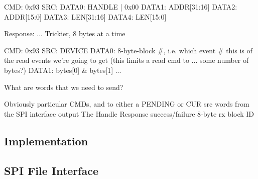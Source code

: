 CMD: 0x93
SRC: 
DATA0: HANDLE | 0x00
DATA1: ADDR[31:16]
DATA2: ADDR[15:0]
DATA3: LEN[31:16]
DATA4: LEN[15:0]

Response: ... Trickier, 8 bytes at a time

 
CMD: 0x93
SRC: DEVICE
DATA0: 8-byte-block #, i.e. which event # this is of the read events we're going to get (this limits a read cmd to ... some number of bytes?)
DATA1: bytes[0] & bytes[1]
...

What are words that we need to send? 

Obviously particular CMDs, and to either a PENDING or CUR src
words from the SPI interface output
The Handle
Response success/failure
8-byte rx block ID

\subsection{Implementation}

\subsection{SPI File Interface}
